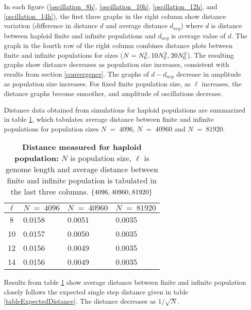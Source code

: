 In each figure (\ref{oscillation_8h}, \ref{oscillation_10h}, \ref{oscillation_12h}, 
and \ref{oscillation_14h}), the first three graphs in the right column show 
distance variation (difference in distance $d$ and average distance $d_{avg}$)  
where $d$ is distance between haploid finite and infinite populations and $d_{avg}$ is average value of $d$. 
The graph in the fourth row of the right column combines distance plots between finite and infinite populations for sizes 
($N = N_0^2, \hspace{0.01in}10N_0^2, \hspace{0.01in}20N_0^2$). The resulting graphs show distance decreases 
as population size increases, consistent with results from section \ref{convergence}. 
The graphs of $d-d_{avg}$ decrease in amplitude as population size increases. 
For fixed finite population size, as $\ell$ increases, the distance graphs become smoother, and amplitude of oscillations decrease. 

Distance data obtained from simulations for haploid populations are summarized in table \ref{tableDistanceOscHap},  
which tabulates average distance between finite and infinite populations 
for population sizes $N \;=\; 4096 $, $N \;=\; 40960 $ and $N \;=\; 81920 $.
\begin{table}[ht]
\caption{\textbf{Distance measured for haploid population:} $N$ is population size, $\ell$ is genome length 
and average distance between finite and infinite population is tabulated in the last three columns. $\{4096, \hspace{0.01in} 40960, \hspace{0.01in} 81920\}$ }
\centering
\begin{tabularx}{0.75\textwidth}{ c *{3}{X}}
\toprule
$\ell$ & $N \;=\; 4096 $ & $N \;=\; 40960 $ & $N \;=\; 81920 $\\
\midrule
8 & 0.0158 & 0.0051 & 0.0035 \\
10 & 0.0157 & 0.0050 & 0.0035 \\ 
12 & 0.0156 & 0.0049 & 0.0035 \\
14 & 0.0156 & 0.0049 & 0.0035 \\ 
\bottomrule
\end{tabularx}
\label{tableDistanceOscHap}
\end{table}

Results from table \ref{tableDistanceOscHap} show average distance between finite and infinite population closely follows 
the expected single step distance given in table \ref{tableExpectedDistance}. The distance decreases as $1/\sqrt{N}$.


